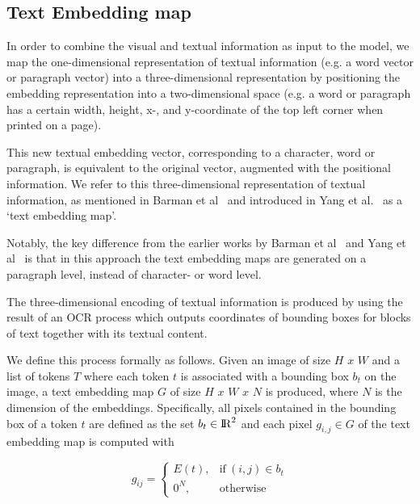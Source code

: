 \documentclass[english, bibtex]{kththesis}
\begin{document}
\subsection{Text Embedding map}

In order to combine the visual and textual information as input to the model, we map the one-dimensional representation of textual information (e.g. a word vector or paragraph vector) into a three-dimensional representation by positioning the embedding representation into a two-dimensional space (e.g. a word or paragraph has a certain width, height, x-, and y-coordinate of the top left corner when printed on a page). 

This new textual embedding vector, corresponding to a character, word or paragraph, is equivalent to the original vector, augmented with the positional information. We refer to this three-dimensional representation of textual information, as mentioned in Barman et al~\cite{jdmdh:7097} and introduced in Yang et al.~\cite{DBLP:journals/corr/YangYAKKG17} as a ‘text embedding map’.

Notably, the key difference from the earlier works by Barman et al~\cite{jdmdh:7097} and Yang et al~\cite{DBLP:journals/corr/YangYAKKG17} is that in this approach the text embedding maps are generated on a paragraph level, instead of character- or word level.

The three-dimensional encoding of textual information is produced by using the result of an OCR process which outputs coordinates of bounding boxes for blocks of text together with its textual content.

We define this process formally as follows. Given an image of size $H$ $x$ $W$ and a list of tokens $T$ where each token $t$ is associated with a bounding box $b_t$ on the image, a text embedding map $G$ of size $H$ $x$ $W$ $x$ $N$ is produced, where $N$ is the dimension of the embeddings. Specifically, all pixels contained in the bounding box of a token $t$ are defined as the set $b_t \in {\rm I\!R}^2$ and each pixel $g_{i,j} \in G$ of the text embedding map is computed with 

\begin{equation}
	g_{ij} = 
	    \begin{cases}
	      E(t), & \text{if}\ (i,j) \in b_t \\
	      0^N, & \text{otherwise}
	    \end{cases}
  	\label{eqn:textembedding}
\end{equation}
\end{document}
